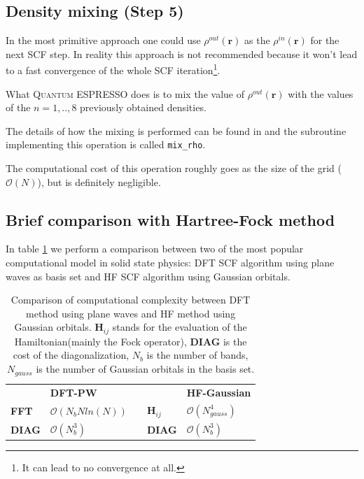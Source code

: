 \documentclass[a4paper,12pt]{article}
\newcommand\mf[1]{\mathbf{#1}}
\newcommand\densin{\rho^{in}(\mathbf{r})}
\newcommand\densout{\rho^{out}(\mathbf{r})}
\newcommand\QE{\textsc{Quantum} ESPRESSO }
\newcommand\bigO{\mathcal{O}}
\begin{document}
\subsection{Density mixing (Step 5)}
In the most primitive approach one could use $\densout$ as the $\densin$ for the next SCF step. In reality this approach is not recommended because it won't lead to a fast convergence of the whole SCF iteration\footnote{It can lead to no convergence at all.}.

What \QE does is to mix the value of $\densout$ with the values of the $n=1,..,8$ previously obtained densities.

The details of how the mixing is performed can be found in \cite{Johnson} and the subroutine implementing this operation is called \texttt{mix\_rho}.

The computational cost of this operation roughly goes as the size of the grid ($\bigO(N)$), but is definitely negligible.


\subsection{Brief comparison with Hartree-Fock method}
In table \ref{tab:HF-DFTComp} we perform a comparison between two of the most popular computational model in solid state physics: DFT SCF algorithm using plane waves as basis set and HF SCF algorithm using Gaussian orbitals.


\begin{table}[h]
\centering
\begin{tabular}{l|l|ll|l|}
\cline{2-2} \cline{5-5}
                                    & \textbf{DFT-PW}        &                       &                    & \textbf{HF-Gaussian} \\ \cline{1-2} \cline{4-5} 
\multicolumn{1}{|l|}{\textbf{FFT}}  & $\bigO(N_{b}N ln(N) )$ & \multicolumn{1}{l|}{} & $\mf{H}_{ij}$ & $\bigO(N_{gauss}^4)$ \\ \cline{1-2} \cline{4-5} 
\multicolumn{1}{|l|}{\textbf{DIAG}} & $\bigO(N_{b}^3)$       & \multicolumn{1}{l|}{} & \textbf{DIAG}      & $\bigO(N_{b}^3)$     \\ \cline{1-2} \cline{4-5} 
\end{tabular}
\caption{Comparison of computational complexity between DFT method using plane waves and HF method using Gaussian orbitals. $\mf{H}_{ij}$ stands for the evaluation of the Hamiltonian(mainly the Fock operator), \textbf{DIAG} is the cost of the diagonalization, $N_b$ is the number of bands, $N_{gauss}$ is the number of Gaussian orbitals in the basis set.}
\label{tab:HF-DFTComp}
\end{table}
\end{document}
